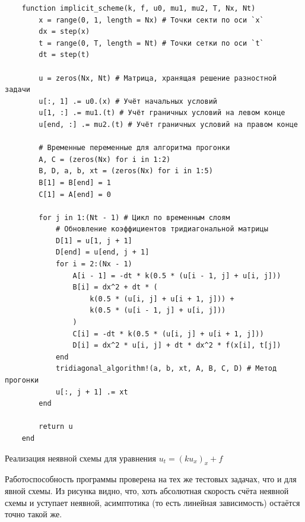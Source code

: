 \begin{listing}
    \begin{verbatim}
    function implicit_scheme(k, f, u0, mu1, mu2, T, Nx, Nt)
        x = range(0, 1, length = Nx) # Точки секти по оси `x`
        dx = step(x)
        t = range(0, T, length = Nt) # Точки сетки по оси `t`
        dt = step(t)
    
        u = zeros(Nx, Nt) # Матрица, хранящая решение разностной задачи
        u[:, 1] .= u0.(x) # Учёт начальных условий
        u[1, :] .= mu1.(t) # Учёт граничных условий на левом конце
        u[end, :] .= mu2.(t) # Учёт граничных условий на правом конце
    
        # Временные переменные для алгоритма прогонки
        A, C = (zeros(Nx) for i in 1:2)
        B, D, a, b, xt = (zeros(Nx) for i in 1:5)
        B[1] = B[end] = 1
        C[1] = A[end] = 0
    
        for j in 1:(Nt - 1) # Цикл по временным слоям
            # Обновление коэффициентов тридиагональной матрицы
            D[1] = u[1, j + 1]
            D[end] = u[end, j + 1]
            for i = 2:(Nx - 1)
                A[i - 1] = -dt * k(0.5 * (u[i - 1, j] + u[i, j]))
                B[i] = dx^2 + dt * (
                    k(0.5 * (u[i, j] + u[i + 1, j])) +
                    k(0.5 * (u[i - 1, j] + u[i, j]))
                )
                C[i] = -dt * k(0.5 * (u[i, j] + u[i + 1, j]))
                D[i] = dx^2 * u[i, j] + dt * dx^2 * f(x[i], t[j])
            end
            tridiagonal_algorithm!(a, b, xt, A, B, C, D) # Метод прогонки
            u[:, j + 1] .= xt
        end
    
        return u
    end
    \end{verbatim}
    \caption{Реализация неявной схемы для уравнения $u_t = (ku_x)_x + f$}
    \label{listing:implicit_scheme}
\end{listing}
Работоспособность программы проверена на тех же тестовых задачах, что и для явной схемы.
Из рисунка видно, что, хоть абсолютная скорость счёта неявной схемы и уступает неявной, асимптотика (то есть линейная зависимость) остаётся точно такой же.


